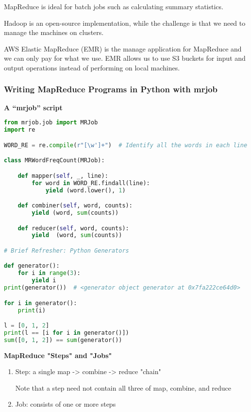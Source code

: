 \documentclass{article}
\begin{document}
MapReduce is ideal for batch jobs such as calculating summary statistics.

Hadoop is an open-source implementation, while the challenge is that we need to manage the machines on clusters.

AWS Elastic MapReduce (EMR) is the manage application for MapReduce and we can only pay for what we use. EMR allows us to use S3 buckets for input and output operations instead of performing on local machines.

\subsubsection{Writing MapReduce Programs in Python with mrjob}

\textbf{A ``mrjob'' script}

\begin{lstlisting}[language=Python]
from mrjob.job import MRJob
import re

WORD_RE = re.compile(r"[\w']+")  # Identify all the words in each line of text

class MRWordFreqCount(MRJob):

    def mapper(self, _, line):
        for word in WORD_RE.findall(line):
            yield (word.lower(), 1)

    def combiner(self, word, counts):
        yield (word, sum(counts))

    def reducer(self, word, counts):
        yield  (word, sum(counts))

# Brief Refresher: Python Generators

def generator():
    for i in range(3):
        yield i
print(generator())  # <generator object generator at 0x7fa222ce64d0>

for i in generator():
    print(i)

l = [0, 1, 2]
print(l == [i for i in generator()])
sum([0, 1, 2]) == sum(generator())
\end{lstlisting}

\textbf{MapReduce "Steps" and "Jobs"}
\begin{enumerate}
    \item Step: a single map -> combine -> reduce "chain"

    Note that a step need not contain all three of map, combine, and reduce
    
    \item Job: consists of one or more steps
\end{enumerate}
\end{document}
